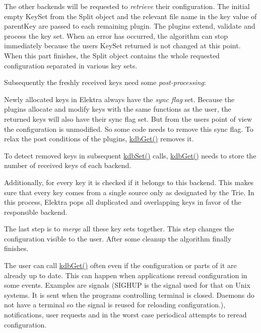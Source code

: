 The other backends will be requested to {\itshape retrieve} their configuration. The initial empty {\ttfamily Key\+Set} from the {\ttfamily Split} object and the relevant file name in the key value of {\ttfamily parent\+Key} are passed to each remaining plugin. The plugins extend, validate and process the key set. When an error has occurred, the algorithm can stop immediately because the user\textquotesingle{}s {\ttfamily Key\+Set} {\ttfamily returned} is not changed at this point. When this part finishes, the {\ttfamily Split} object contains the whole requested configuration separated in various key sets.

Subsequently the freshly received keys need some {\itshape post-\/processing}\+:


\begin{DoxyItemize}
\item Newly allocated keys in Elektra always have the {\itshape sync flag} set. Because the plugins allocate and modify keys with the same functions as the user, the returned keys will also have their sync flag set. But from the user\textquotesingle{}s point of view the configuration is unmodified. So some code needs to remove this sync flag. To relax the post conditions of the plugins, {\ttfamily \hyperlink{group__kdb_ga28e385fd9cb7ccfe0b2f1ed2f62453a1}{kdb\+Get()}} removes it.
\item To detect removed keys in subsequent {\ttfamily \hyperlink{group__kdb_ga11436b058408f83d303ca5e996832bcf}{kdb\+Set()}} calls, {\ttfamily \hyperlink{group__kdb_ga28e385fd9cb7ccfe0b2f1ed2f62453a1}{kdb\+Get()}} needs to store the number of received keys of each backend.
\item Additionally, for every key it is checked if it belongs to this backend. This makes sure that every key comes from a single source only as designated by the {\ttfamily Trie}. In this process, Elektra pops all duplicated and overlapping keys in favor of the responsible backend.
\end{DoxyItemize}

The last step is to {\itshape merge} all these key sets together. This step changes the configuration visible to the user. After some cleanup the algorithm finally finishes.

The user can call {\ttfamily \hyperlink{group__kdb_ga28e385fd9cb7ccfe0b2f1ed2f62453a1}{kdb\+Get()}} often even if the configuration or parts of it are already up to date. This can happen when applications reread configuration in some events. Examples are signals (S\+I\+G\+H\+UP is the signal used for that on Unix systems. It is sent when the program\textquotesingle{}s controlling terminal is closed. Daemons do not have a terminal so the signal is reused for reloading configuration.), notifications, user requests and in the worst case periodical attempts to reread configuration.

